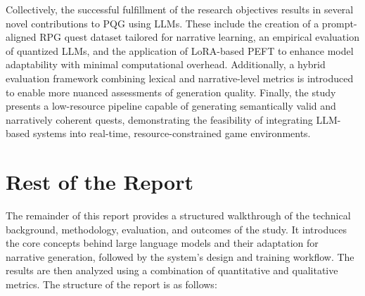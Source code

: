 Collectively, the successful fulfillment of the research objectives results in several novel
contributions to PQG using LLMs. These include the creation of a prompt-aligned RPG
quest dataset tailored for narrative learning, an empirical evaluation of quantized LLMs,
and the application of LoRA-based PEFT to enhance model adaptability with minimal
computational overhead. Additionally, a hybrid evaluation framework combining lexical
and narrative-level metrics is introduced to enable more nuanced assessments of generation
quality. Finally, the study presents a low-resource pipeline capable of generating
semantically valid and narratively coherent quests, demonstrating the feasibility of integrating
LLM-based systems into real-time, resource-constrained game environments.

\section{Rest of the Report}

The remainder of this report provides a structured walkthrough of the technical background,
methodology, evaluation, and outcomes of the study. It introduces the core
concepts behind large language models and their adaptation for narrative generation, followed
by the system's design and training workflow. The results are then analyzed using
a combination of quantitative and qualitative metrics. The structure of the report is as
follows:

